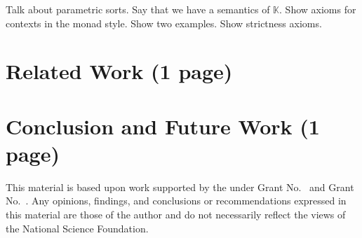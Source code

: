 \documentclass[acmsmall,review,anonymous]{acmart}
\newcommand{\K}{$\mathbb{K}$\xspace}
\begin{document}
Talk about parametric sorts.
Say that we have a semantics of \K.
Show axioms for contexts in the monad style.
Show two examples.
Show strictness axioms.

\section{Related Work (1 page)}

\section{Conclusion and Future Work (1 page)}

\begin{acks}                            %
  This material is based upon work supported by the
   under Grant
  No.~ and Grant
  No.~.  Any opinions, findings, and
  conclusions or recommendations expressed in this material are those
  of the author and do not necessarily reflect the views of the
  National Science Foundation.
\end{acks}

\end{document}
